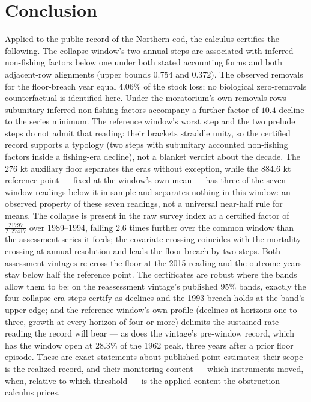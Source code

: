 \documentclass[10pt,twocolumn]{article}
\theoremstyle{plain}
\theoremstyle{remark}
\begin{document}
\section{Conclusion}\label{conclusion}

Applied to the public record of the Northern cod, the calculus
certifies the following. The collapse window's two annual steps are
associated with inferred non-fishing factors below one under
both stated accounting forms and both adjacent-row alignments (upper
bounds \(0.754\) and \(0.372\)). The observed removals for the
floor-breach year equal \(4.06\%\) of the stock loss; no biological
zero-removals counterfactual is identified here. Under the moratorium's
own removals rows subunitary inferred non-fishing factors accompany
a further factor-of-\(10.4\) decline to the series minimum. The reference
window's worst step and the two prelude steps do not admit that
reading: their brackets straddle unity, so the certified record
supports a typology (two steps with subunitary accounted non-fishing factors
inside a fishing-era decline), not a blanket verdict about the decade. The
\(276\) kt auxiliary floor separates the eras without exception,
while the \(884.6\) kt reference point --- fixed at the window's own
mean --- has three of the seven window readings below it in sample
and separates nothing in this window: an observed property of
these seven readings, not a universal near-half rule for means. The collapse is present in
the raw survey index at a certified factor of
\(\tfrac{21797}{2127417}\) over 1989--1994, falling \(2.6\) times
further over the common window than the assessment series it feeds;
the covariate crossing coincides with the mortality crossing at annual
resolution and leads the floor breach by two steps. Both assessment
vintages re-cross the floor at the 2015 reading and the outcome years
stay below half the reference point. The certificates are robust
where the bands allow them to be: on the reassessment vintage's
published 95\% bands, exactly the four collapse-era steps certify as
declines and the 1993 breach holds at the band's upper edge; and the
reference window's own profile (declines at horizons one to three,
growth at every horizon of four or more) delimits the sustained-rate
reading the record will bear --- as does the vintage's pre-window
record, which has the window open at \(28.3\%\) of the 1962 peak,
three years after a prior floor episode. These are exact statements about
published point estimates; their scope is the realized record, and
their monitoring content --- which instruments moved, when, relative to
which threshold --- is the applied content the obstruction calculus
prices.
\end{document}
